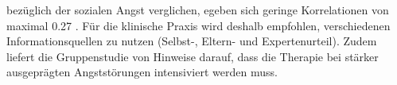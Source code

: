 bezüglich der sozialen Angst verglichen, egeben sich geringe Korrelationen von maximal 0.27 \cite{Moller:2011}. Für die klinische Praxis wird deshalb empfohlen, verschiedenen Informationsquellen zu nutzen (Selbst-, Eltern- und Expertenurteil). Zudem liefert die Gruppenstudie von  Hinweise darauf, dass die Therapie bei stärker ausgeprägten Angststörungen intensiviert werden muss.







